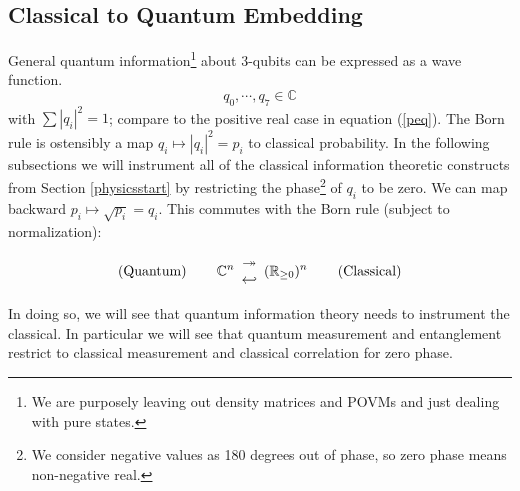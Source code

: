 \documentclass[12pt,a4paper]{article}
\theoremstyle{myrule}
\theoremstyle{postulate}
\theoremstyle{definition}
\begin{document}
\subsection{Classical to Quantum Embedding}
\label{embed}
General quantum information\footnote{We are purposely leaving out density matrices and POVMs and just dealing with pure states.} about 3-qubits can be expressed as a wave function.
\[
   q_\mathit{0},\cdots,q_\mathit{7} \in \mathbb{C}
\]
with $\sum |q_i|^2 = 1$; compare to the positive real case in equation (\ref{peq}).  The Born rule is ostensibly a map $q_i \mapsto |q_i|^2 = p_i$ to classical probability.  In the following subsections we will instrument all of the classical information theoretic constructs from Section \ref{physicsstart} by restricting the phase\footnote{We consider negative values as 180 degrees out of phase, so zero phase means non-negative real.} of $q_i$ to be zero.  We can map backward $p_i \mapsto \sqrt{p_i} = q_i$.  This commutes with the Born rule (subject to normalization):

{
\renewcommand{\arraystretch}{0.1}
\[
\text{(Quantum)} \hspace{0.3 in}
\mathbb{C}^n \begin{array}{c} \twoheadrightarrow \\ \hookleftarrow \end{array}
(\mathbb{R}_{\ge 0})^n
\hspace{0.3 in} \text{(Classical)} 
\]
}

In doing so, we will see that quantum information theory needs to instrument the classical.  In particular we will see that quantum measurement and entanglement restrict to classical measurement and classical correlation for zero phase.
\end{document}
